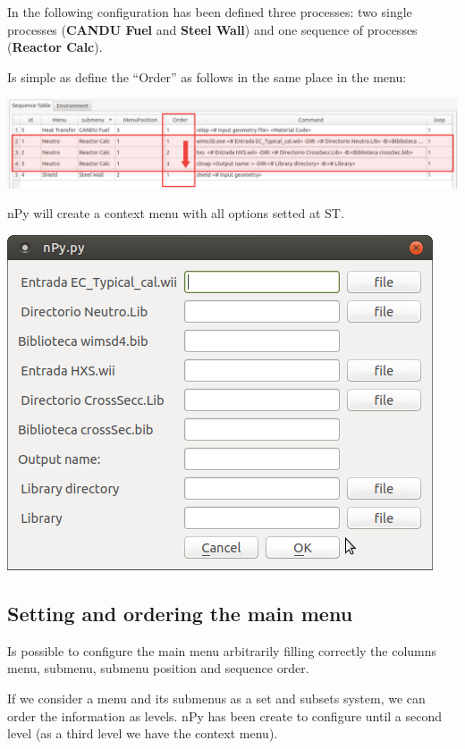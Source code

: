 \documentclass[a4paper,10pt]{article}
\begin{document}
In the following configuration has been defined three processes: two single processes (\textbf{CANDU Fuel} and \textbf{Steel Wall}) and one sequence of processes (\textbf{Reactor Calc}).

Is simple as define the ``Order'' as follows in the same place in the menu:

\begin{center}
 \includegraphics[width=\textwidth]{img/orderingSequenceMark.png}
\end{center}

nPy will create a context menu with all options setted at ST.

\begin{center}
 \includegraphics[width=\textwidth]{img/orderingSequenceContextMenu.png}
\end{center}


\subsection{Setting and ordering the main menu}

Is possible to configure the main menu arbitrarily filling correctly the columns menu, submenu, submenu position and sequence order.

If we consider a menu and its submenus as a set and subsets system, we can order the information as levels. nPy has been create to configure until a second level (as a third level we have the context menu).
\end{document}
